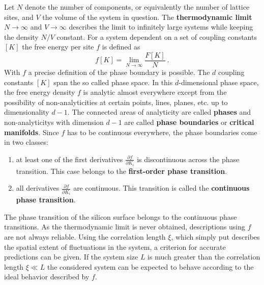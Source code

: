 	Let $N$ denote the number of components, or equivalently the number of lattice sites, and $V$ the volume of the system in question. The \textbf{thermodynamic limit} $N \rightarrow \infty$ and $V \rightarrow \infty$ describes the limit to infinitely large systems while keeping the density $N/V$ constant. For a system dependent on a set of coupling constants $[K]$ the free energy per site $f$ is defined as
	\begin{equation}
		f[K] =	\lim\limits_{N \rightarrow \infty} \frac{F[K]}{N} ~.
	\end{equation}
	With $f$ a precise definition of the phase boundary is possible. The $d$ coupling constants $[K]$ span the so called phase space. In this $d$-dimensional phase space, the free energy density $f$ is analytic almost everywhere except from the possibility of non-analyticities at certain points, lines, planes, etc. up to dimensionality $d-1$. The connected areas of analyticity are called \textbf{phases} and non-analyticitys with dimension $d-1$ are called \textbf{phase boundaries} or \textbf{critical manifolds}. Since $f$ has to be continuous everywhere, the phase boundaries come in two classes:
	\begin{enumerate}
		\item at least one of the first derivatives $\frac{\partial f}{\partial K_i}$ is discontinuous across the phase transition. This case belongs to the \textbf{first-order phase transition}.
		\item all derivatives $\frac{\partial f}{\partial K_i}$ are continuous. This transition is called the \textbf{continuous phase transition}.
	\end{enumerate}
	The phase transition of the silicon surface belongs to the continuous phase transitions. As the thermodynamic limit is never obtained, descriptions using $f$ are not always reliable. Using the correlation length $\xi$, which simply put describes the spatial extent of fluctuations in the system, a criterion for accurate predictions can be given. If the system size $L$ is much greater than the correlation length $\xi \ll L$ the considered system can be expected to behave according to the ideal behavior described by $f$. \\
	
